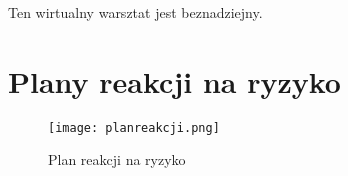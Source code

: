Ten wirtualny warsztat jest beznadziejny.


\section{Plany reakcji na ryzyko}

\begin{figure}[h]
\begin{center}
\texttt{[image: planreakcji.png]}
\caption[Plan reakcji na ryzyko]{Plan reakcji na ryzyko}
\label{rysunekProces}
\end{center}
\end{figure}


